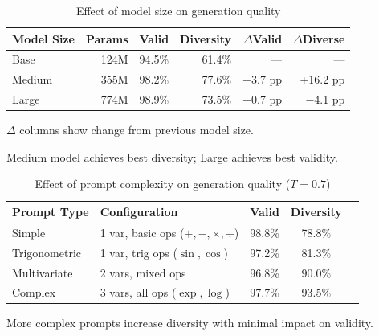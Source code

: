 \begin{table}[htbp]
\centering
\caption{Effect of model size on generation quality}
\label{tab:scaling}
\begin{tabular}{@{}lrrrrr@{}}
\toprule
\textbf{Model Size} & \textbf{Params} & \textbf{Valid} & \textbf{Diversity} & $\Delta$\textbf{Valid} & $\Delta$\textbf{Diverse} \\
\midrule
Base & 124M & 94.5\% & 61.4\% & --- & --- \\
Medium & 355M & 98.2\% & 77.6\% & +3.7 pp & +16.2 pp \\
Large & 774M & 98.9\% & 73.5\% & +0.7 pp & $-$4.1 pp \\
\bottomrule
\end{tabular}
\begin{tablenotes}
\small
\item $\Delta$ columns show change from previous model size.
\item Medium model achieves best diversity; Large achieves best validity.
\end{tablenotes}
\end{table}

\begin{table}[htbp]
\centering
\caption{Effect of prompt complexity on generation quality ($T=0.7$)}
\label{tab:prompt_complexity}
\begin{tabular}{@{}llccc@{}}
\toprule
\textbf{Prompt Type} & \textbf{Configuration} & \textbf{Valid} & \textbf{Diversity} \\
\midrule
Simple & 1 var, basic ops ($+,-,\times,\div$) & 98.8\% & 78.8\% \\
Trigonometric & 1 var, trig ops ($\sin,\cos$) & 97.2\% & 81.3\% \\
Multivariate & 2 vars, mixed ops & 96.8\% & 90.0\% \\
Complex & 3 vars, all ops ($\exp,\log$) & 97.7\% & 93.5\% \\
\bottomrule
\end{tabular}
\begin{tablenotes}
\small
\item More complex prompts increase diversity with minimal impact on validity.
\end{tablenotes}
\end{table}

